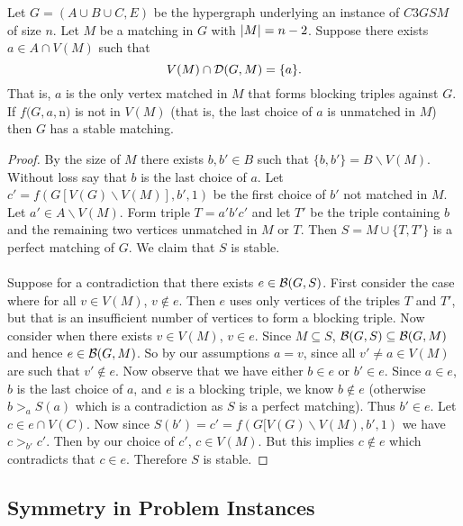 \begin{lemma}\label{lemma:fixing}
Let $G = (A\cup B \cup C, E)$ be the hypergraph underlying an instance of $C3GSM$ of size $n$. Let $M$ be a matching in $G$ with $\left|M\right| = n-2$. Suppose there exists $a \in A \cap V(M)$ such that $$V(M) \cap \mathcal{D}(G,M) = \{a\}.$$ That is, $a$ is the only vertex matched in $M$ that forms blocking triples against $G$. If $f(G, a, $n$)$ is not in $V(M)$ (that is, the last choice of $a$ is unmatched in $M$) then $G$ has a stable matching.
\end{lemma}
\begin{proof}
By the size of $M$ there exists $b,b' \in B$ such that $\{b,b'\} = B \backslash V(M)$. Without loss say that $b$ is the last choice of $a$. Let $c' = f(G[V(G)\backslash V(M)],b', 1)$ be the first choice of $b'$ not matched in $M$. Let $a' \in A\backslash V(M)$. Form triple $T = a'b'c'$ and let $T'$ be the triple containing $b$ and the remaining two vertices unmatched in $M$ or $T$. Then $S = M \cup \{T, T'\}$ is a perfect matching of $G$. We claim that $S$ is stable.
\paragraph{}
Suppose for a contradiction that there exists $e \in \mathcal{B}(G,S)$. First consider the case where for all $v \in V(M)$, $v \not\in e$. Then $e$ uses only vertices of the triples $T$ and $T'$, but that is an insufficient number of vertices to form a blocking triple. Now consider when there exists $v \in V(M)$, $v \in e$. Since $M \subseteq S$, $\mathcal{B}(G,S) \subseteq \mathcal{B}(G,M)$ and hence $e \in \mathcal{B}(G,M)$. So by our assumptions $a=v$, since all $v' \neq a \in V(M)$ are such that $v' \not\in e$. Now observe that we have either $b \in e$ or $b' \in e$. Since $a \in e$, $b$ is the last choice of $a$, and $e$ is a blocking triple, we know $b \not\in e$ (otherwise $b >_a S(a)$ which is a contradiction as $S$ is a perfect matching). Thus $b' \in e$. Let $c \in e \cap V(C)$. Now since $S(b') = c' = f(G[V(G)\backslash V(M),b',1)$ we have $c >_{b'} c'$. Then by our choice of $c'$, $c \in V(M)$. But this implies $c \not \in e$ which contradicts that $c \in e$. Therefore $S$ is stable.
\end{proof}
\subsection{Symmetry in Problem Instances}\label{subsec:symmetry}
